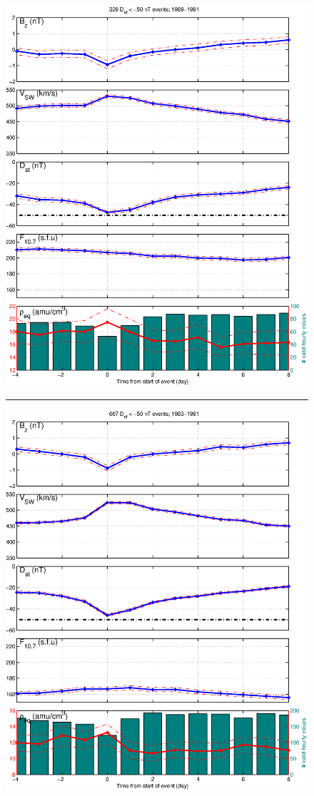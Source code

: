 \documentclass[10pt,twocolumn]{article}
\begin{document}
\begin{figure}[tp!]
\centering
\includegraphics[scale=0.40]{paperfigures/stormavs-dst-50-tak-GOES6.eps}
\rule[1ex]{5cm}{1pt}
\includegraphics[scale=0.40]{paperfigures/stormavs-dst-day-GOES6.eps}

\end{figure}
\end{document}
